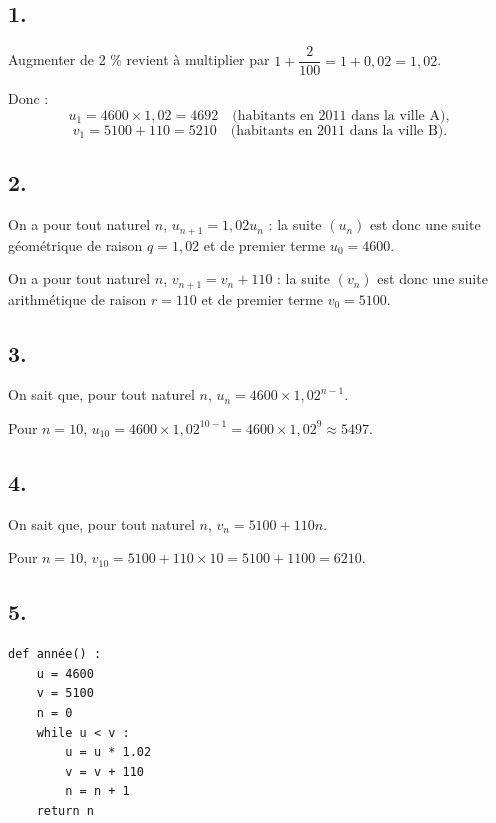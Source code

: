 \subsection*{1.}

Augmenter de 2 \% revient à multiplier par \(1 + \dfrac{2}{100} = 1 + 0{,}02 = 1{,}02\).

Donc :
\[
u_1 = 4600 \times 1{,}02 = 4692 \quad \text{(habitants en 2011 dans la ville A)},
\]
\[
v_1 = 5100 + 110 = 5210 \quad \text{(habitants en 2011 dans la ville B)}.
\]

\subsection*{2.}

On a pour tout naturel \(n\), \(u_{n+1} = 1{,}02u_n\) : la suite \((u_n)\) est donc une suite géométrique de raison \(q = 1{,}02\) et de premier terme \(u_0 = 4600\).

On a pour tout naturel \(n\), \(v_{n+1} = v_n + 110\) : la suite \((v_n)\) est donc une suite arithmétique de raison \(r = 110\) et de premier terme \(v_0 = 5100\).

\subsection*{3.}

On sait que, pour tout naturel \(n\), \(u_n = 4600 \times 1{,}02^{n - 1}\).

Pour \(n = 10\), \(u_{10} = 4600 \times 1{,}02^{10 - 1} = 4600 \times 1{,}02^9 \approx 5497\).

\subsection*{4.}

On sait que, pour tout naturel \(n\), \(v_n = 5100 + 110n\).

Pour \(n = 10\), \(v_{10} = 5100 + 110 \times 10 = 5100 + 1100 = 6210\).

\subsection*{5.}

\begin{center}
\begin{lstlisting}[style=python]
def année() :
    u = 4600
    v = 5100
    n = 0
    while u < v :
        u = u * 1.02
        v = v + 110
        n = n + 1
    return n
\end{lstlisting}
\end{center}
